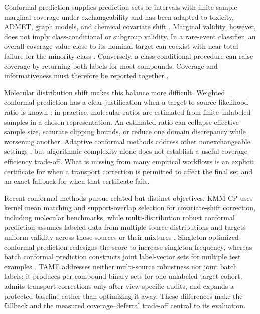 Conformal prediction supplies prediction sets or intervals with finite-sample marginal coverage under exchangeability and has been adapted to toxicity, ADMET, graph models, and chemical covariate shift \citep{zhang2021toxicity,li2024conformalized,laghuvarapu2023codrug}. Marginal validity, however, does not imply class-conditional or subgroup validity. In a rare-event classifier, an overall coverage value close to its nominal target can coexist with near-total failure for the minority class \citep{krstajic2021critical,cauchois2021knowing,bastani2022multivalid,ding2023classconditional}. Conversely, a class-conditional procedure can raise coverage by returning both labels for most compounds. Coverage and informativeness must therefore be reported together \citep{fisch2022trading}.

Molecular distribution shift makes this balance more difficult. Weighted conformal prediction has a clear justification when a target-to-source likelihood ratio is known \citep{tibshirani2019covariate}; in practice, molecular ratios are estimated from finite unlabeled samples in a chosen representation. An estimated ratio can collapse effective sample size, saturate clipping bounds, or reduce one domain discrepancy while worsening another. Adaptive conformal methods address other nonexchangeable settings \citep{gibbs2021adaptive,angelopoulos2023pid}, but algorithmic complexity alone does not establish a useful coverage--efficiency trade-off. What is missing from many empirical workflows is an explicit certificate for when a transport correction is permitted to affect the final set and an exact fallback for when that certificate fails.

Recent conformal methods pursue related but distinct objectives. KMM-CP uses kernel mean matching and support-overlap selection for covariate-shift correction, including molecular benchmarks, while multi-distribution robust conformal prediction assumes labeled data from multiple source distributions and targets uniform validity across those sources or their mixtures \citep{laghuvarapu2026kmmcp,yang2026multidistribution}. Singleton-optimized conformal prediction redesigns the score to increase singleton frequency, whereas batch conformal prediction constructs joint label-vector sets for multiple test examples \citep{wang2025socop,gazin2025batch}. TAME addresses neither multi-source robustness nor joint batch labels: it produces per-compound binary sets for one unlabeled target cohort, admits transport corrections only after view-specific audits, and expands a protected baseline rather than optimizing it away. These differences make the fallback and the measured coverage--deferral trade-off central to its evaluation.

